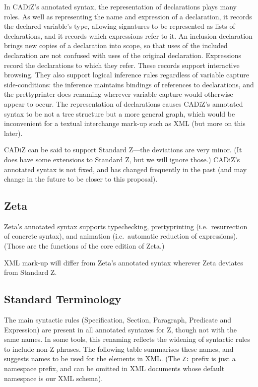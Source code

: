 \documentclass{llncs}  %
\newcommand{\CADiZ}{CADiZ}
\newcommand{\Zeta}{Zeta}
\begin{document}
In \CADiZ's annotated syntax,
the representation of declarations plays many roles.
As well as representing the name and expression of a declaration,
it records the declared variable's type,
allowing signatures to be represented as lists of declarations,
and it records which expressions refer to it.
An inclusion declaration brings new copies of a declaration into scope,
so that uses of the included declaration are not
confused with uses of the original declaration.
Expressions record the declarations to which they refer.
These records support interactive browsing.
They also support logical inference rules
regardless of variable capture side-conditions:
the inference maintains bindings of references to declarations,
and the prettyprinter does renaming
wherever variable capture would otherwise appear to occur.
The representation of declarations causes \CADiZ's annotated syntax
to be not a tree structure but a more general graph,
which would be inconvenient for a textual interchange mark-up such as XML
(but more on this later).

\CADiZ\cite{CADiZ} can be said to support Standard Z---the deviations
are very minor.
(It does have some extensions to Standard Z, but we will ignore those.)
\CADiZ's annotated syntax is not fixed, and has changed frequently in the
past (and may change in the future to be closer to this proposal). 

\subsection{\Zeta}

\Zeta's annotated syntax supports typechecking,
prettyprinting (i.e.\ resurrection of concrete syntax),
and animation (i.e.\ automatic reduction of expressions).
(Those are the functions of the core edition of \Zeta.)

XML mark-up will differ from \Zeta's annotated syntax
wherever \Zeta\cite{Zeta} deviates from Standard Z.

\subsection{Standard Terminology}

The main syntactic rules (Specification, Section, Paragraph, Predicate and
Expression) are present in all annotated syntaxes for Z, though not with
the same names.  In some tools, this renaming reflects the widening of
syntactic rules to include non-Z phrases.  The following table summarises
these names, and suggests names to be used for the elements in XML.
(The \verb!Z:! prefix is just a namespace prefix, and can be omitted
in XML documents whose default namespace is our XML schema).
\end{document}
